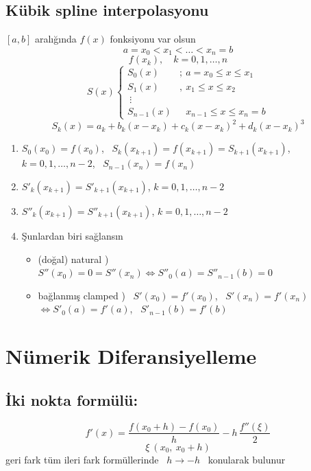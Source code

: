 \documentclass[11pt,a4paper]{article}
\begin{document}
\subsection{Kübik spline interpolasyonu}
\noindent{}$[a,b]$ aralığında $f(x)$ fonksiyonu var olsun
\[ a = x_0 < x_1 < \dots < x_n = b \]
\[ f(x_k), \quad k = 0, 1, \dots, n \]
\[
  S(x)
  \begin{cases}
    S_0(x) & ;\ a = x_0 \le x \le x_1 \\
    S_1(x) & ,\ x_1 \le x \le x_2 \\
    \ \vdots & \\
    S_{n-1}(x) & \phantom{,}\ x_{n-1} \le x \le x_n = b
  \end{cases}
\]
\[ S_k(x) = a_k + b_k(x - x_k) + c_k(x - x_k)^2 + d_k(x - x_k)^3 \]
\begin{enumerate}[label=\alph*)]
  \item $S_0(x_0) = f(x_0)$, \ $S_k(x_{k+1}) = f(x_{k+1}) = S_{k+1}(x_{k+1})$, \\
    $k = 0, 1, \dots, n-2$, \ $S_{n-1}(x_n) = f(x_n)$
  \item $S'_k(x_{k+1}) = S'_{k+1}(x_{k+1})$, \quad $k = 0, 1, \dots, n-2$
  \item $S''_k(x_{k+1}) = S''_{k+1}(x_{k+1})$, \quad $k = 0, 1, \dots, n-2$
  \item Şunlardan biri sağlansın
    \begin{itemize}[label={}]
      \item (doğal) {\small natural} ) \ $S''(x_0) = 0 = S''(x_n) \Longleftrightarrow
        S''_0(a) = S''_{n-1}(b) = 0$
      \item bağlanmış {\small clamped} ) \ $S'(x_0) = f'(x_0)$, \ $S'(x_n) = f'(x_n)$ \\
        \hspace*{3cm} $\Longleftrightarrow S'_0(a) = f'(a)$, \ $S'_{n-1}(b) = f'(b)$
    \end{itemize}
\end{enumerate}

\section{Nümerik Diferansiyelleme}
\subsection{İki nokta formülü:}
\[ f'(x) = \frac{f(x_0 + h) - f(x_0)}{h} - h\,\frac{f''(\xi)}{2} \]
\[ \xi \ (x_0,\ x_0 + h) \]
geri fark tüm ileri fark formüllerinde \ $h \rightarrow -h$ \ konularak bulunur
\end{document}
